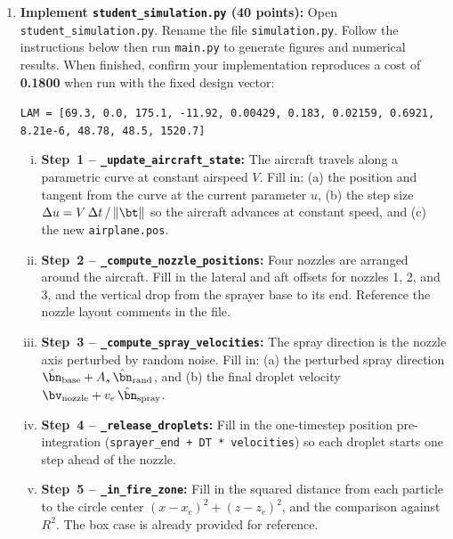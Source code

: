 \documentclass{article}
\begin{document}
\begin{enumerate}
\newpage
\item[2. (b)] \textbf{Implement \texttt{student\_simulation.py} (40 points):}
Open \texttt{student\_simulation.py}. Rename the file \texttt{simulation.py}. Follow the instructions below then run \texttt{main.py} to generate figures and numerical results.
When finished, confirm your implementation reproduces a cost of \textbf{0.1800} when run with the fixed design vector:
\begin{center}
\texttt{LAM = [69.3, 0.0, 175.1, -11.92, 0.00429, 0.183, 0.02159, 0.6921, 8.21e-6, 48.78, 48.5, 1520.7]}
\end{center}

\begin{enumerate}[(i)]
    \item \textbf{Step~1 -- \texttt{\_update\_aircraft\_state}:}
          The aircraft travels along a parametric curve at constant airspeed $V$.
          Fill in: (a) the position and tangent from the curve at the current parameter $u$,
          (b) the step size $\Delta u = V\,\Delta t\,/\,\|\bt\|$ so the aircraft advances at constant speed, and
          (c) the new \texttt{airplane.pos}.

    \item \textbf{Step~2 -- \texttt{\_compute\_nozzle\_positions}:}
          Four nozzles are arranged around the aircraft.
          Fill in the lateral and aft offsets for nozzles 1, 2, and 3, and the
          vertical drop from the sprayer base to its end.
          Reference the nozzle layout comments in the file.

    \item \textbf{Step~3 -- \texttt{\_compute\_spray\_velocities}:}
          The spray direction is the nozzle axis perturbed by random noise.
          Fill in: (a) the perturbed spray direction
          $\hat{\bn}_\text{base} + A_s\,\hat{\bn}_\text{rand}$, and
          (b) the final droplet velocity $\bv_\text{nozzle} + v_e\,\hat{\bn}_\text{spray}$.

    \item \textbf{Step~4 -- \texttt{\_release\_droplets}:}
          Fill in the one-timestep position pre-integration
          (\texttt{sprayer\_end + DT * velocities}) so each droplet starts
          one step ahead of the nozzle.

    \item \textbf{Step~5 -- \texttt{\_in\_fire\_zone}:}
          Fill in the squared distance from each particle to the circle center
          $(x - x_c)^2 + (z - z_c)^2$, and the comparison against $R^2$.
          The box case is already provided for reference.


\end{enumerate}
\end{enumerate}
\end{document}
